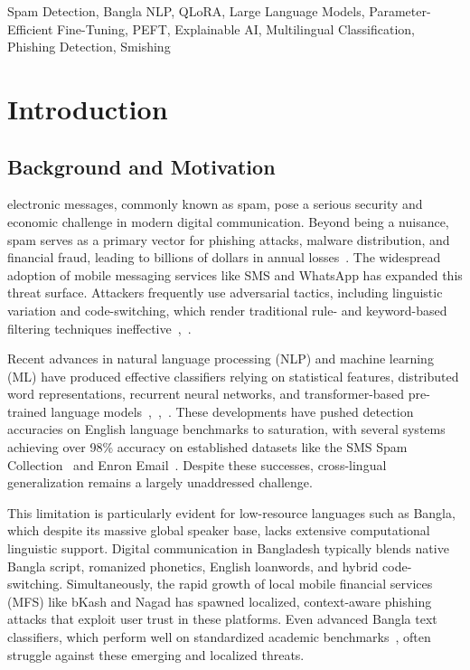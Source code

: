 \documentclass[journal]{IEEEtran}
\begin{document}
\begin{IEEEkeywords}
Spam Detection, Bangla NLP, QLoRA, Large Language Models, Parameter-Efficient Fine-Tuning, PEFT, Explainable AI, Multilingual Classification, Phishing Detection, Smishing
\end{IEEEkeywords}

\section{Introduction}

\subsection{Background and Motivation}

 electronic messages, commonly known as spam, pose a serious security and economic challenge in modern digital communication. Beyond being a nuisance, spam serves as a primary vector for phishing attacks, malware distribution, and financial fraud, leading to billions of dollars in annual losses~\cite{ref1}. The widespread adoption of mobile messaging services like SMS and WhatsApp has expanded this threat surface. Attackers frequently use adversarial tactics, including linguistic variation and code-switching, which render traditional rule- and keyword-based filtering techniques ineffective~\cite{ref5},~\cite{ref6}.

Recent advances in natural language processing (NLP) and machine learning (ML) have produced effective classifiers relying on statistical features, distributed word representations, recurrent neural networks, and transformer-based pre-trained language models~\cite{ref4},~\cite{ref7},~\cite{ref9}. These developments have pushed detection accuracies on English language benchmarks to saturation, with several systems achieving over 98\% accuracy on established datasets like the SMS Spam Collection~\cite{ref1} and Enron Email~\cite{ref9}. Despite these successes, cross-lingual generalization remains a largely unaddressed challenge.

This limitation is particularly evident for low-resource languages such as Bangla, which despite its massive global speaker base, lacks extensive computational linguistic support. Digital communication in Bangladesh typically blends native Bangla script, romanized phonetics, English loanwords, and hybrid code-switching. Simultaneously, the rapid growth of local mobile financial services (MFS) like bKash and Nagad has spawned localized, context-aware phishing attacks that exploit user trust in these platforms. Even advanced Bangla text classifiers, which perform well on standardized academic benchmarks~\cite{ref7}, often struggle against these emerging and localized threats.
\end{document}
